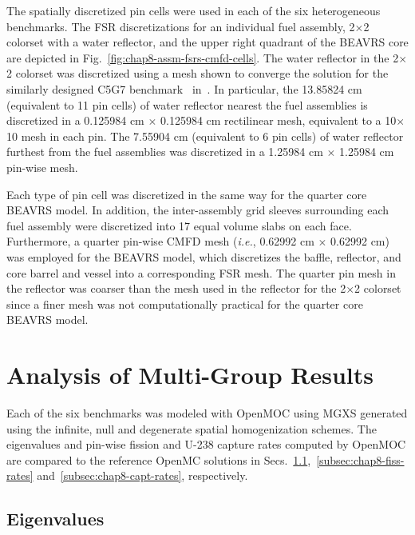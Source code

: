 The spatially discretized pin cells were used in each of the six heterogeneous benchmarks. The \ac{FSR} discretizations for an individual fuel assembly, 2$\times$2 colorset with a water reflector, and the upper right quadrant of the \ac{BEAVRS} core are depicted in Fig.~\ref{fig:chap8-assm-fsrs-cmfd-cells}. The water reflector in the 2$\times$2 colorset was discretized using a mesh shown to converge the solution for the similarly designed C5G7 benchmark~\cite{lewis2003c5g7} in~\cite{boyd2014ms}. In particular, the 13.85824 cm (equivalent to 11 pin cells) of water reflector nearest the fuel assemblies is discretized in a 0.125984 cm $\times$ 0.125984 cm rectilinear mesh, equivalent to a 10$\times$10 mesh in each pin. The 7.55904 cm (equivalent to 6 pin cells) of water reflector furthest from the fuel assemblies was discretized in a 1.25984 cm $\times$ 1.25984 cm pin-wise mesh.

Each type of pin cell was discretized in the same way for the quarter core \ac{BEAVRS} model. In addition, the inter-assembly grid sleeves surrounding each fuel assembly were discretized into 17 equal volume slabs on each face. Furthermore, a quarter pin-wise \ac{CMFD} mesh (\textit{i.e.}, 0.62992 cm $\times$ 0.62992 cm) was employed for the \ac{BEAVRS} model, which discretizes the baffle, reflector, and core barrel and vessel into a corresponding \ac{FSR} mesh. The quarter pin mesh in the reflector was coarser than the mesh used in the reflector for the 2$\times$2 colorset since a finer mesh was not computationally practical for the quarter core \ac{BEAVRS} model.


\section{Analysis of Multi-Group Results}
\label{sec:chap8-mg-results}

Each of the six benchmarks was modeled with OpenMOC using \ac{MGXS} generated using the infinite, null and degenerate spatial homogenization schemes. The eigenvalues and pin-wise fission and U-238 capture rates computed by OpenMOC are compared to the reference OpenMC solutions in Secs.~\ref{subsec:chap8-eigenvalues},~\ref{subsec:chap8-fiss-rates} and~\ref{subsec:chap8-capt-rates}, respectively.

\subsection{Eigenvalues}
\label{subsec:chap8-eigenvalues}

